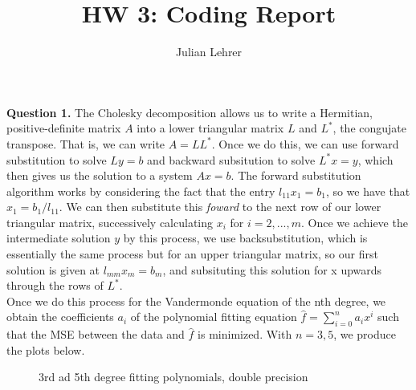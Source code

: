 \documentclass{article}
\title{HW 3: Coding Report}
\date{}
\author{Julian Lehrer}
\begin{document}
\maketitle
\textbf{Question 1.} The Cholesky decomposition allows us to write a Hermitian, positive-definite matrix $A$ into a lower triangular matrix $L$ and $L^*$, the congujate transpose. That is, we can write $A = LL^*$. Once we do this, we can use forward substitution to solve $Ly=b$ and backward subsitution to solve $L^*x = y$, which then gives us the solution to a system $Ax=b$. The forward substitution algorithm works by considering the fact that the entry $l_{11}x_{1} = b_{1}$, so we have that $x_{1} = b_{1}/l_{11}$. We can then substitute this \textit{foward} to the next row of our lower triangular matrix, successively calculating $x_{i}$ for $i=2,...,m$. Once we achieve the intermediate solution $y$ by this process, we use backsubstitution, which is essentially the same process but for an upper triangular matrix, so our first solution is given at $l_{mm}x_{m} = b_{m}$, and subsituting this solution for x upwards through the rows of $L^*$. \\

Once we do this process for the Vandermonde equation of the nth degree, we obtain the coefficients $a_i$ of the polynomial fitting equation $\hat{f} = \sum_{i=0}^{n} a_i x^{i}$ such that the MSE between the data and $\hat{f}$ is minimized. With $n=3,5$, we produce the plots below.

\begin{figure}[H]
    \centering
    \qquad
    \caption{3rd ad 5th degree fitting polynomials, double precision}%
\end{figure}
\end{document}
